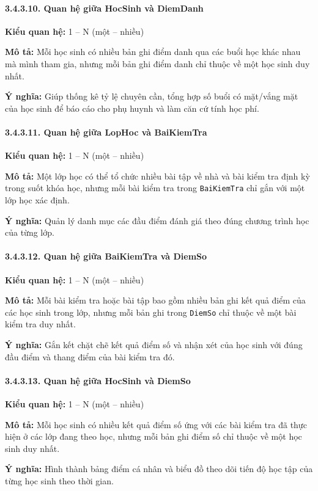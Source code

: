 \paragraph{3.4.3.10. Quan hệ giữa HocSinh và DiemDanh}\mbox{}\par
\textbf{Kiểu quan hệ:} 1 -- N (một -- nhiều)\par
\textbf{Mô tả:} Mỗi học sinh có nhiều bản ghi điểm danh qua các buổi học khác nhau mà mình tham gia, nhưng mỗi bản ghi điểm danh chỉ thuộc về một học sinh duy nhất.\par
\textbf{Ý nghĩa:} Giúp thống kê tỷ lệ chuyên cần, tổng hợp số buổi có mặt/vắng mặt của học sinh để báo cáo cho phụ huynh và làm căn cứ tính học phí.

\paragraph{3.4.3.11. Quan hệ giữa LopHoc và BaiKiemTra}\mbox{}\par
\textbf{Kiểu quan hệ:} 1 -- N (một -- nhiều)\par
\textbf{Mô tả:} Một lớp học có thể tổ chức nhiều bài tập về nhà và bài kiểm tra định kỳ trong suốt khóa học, nhưng mỗi bài kiểm tra trong \texttt{BaiKiemTra} chỉ gắn với một lớp học xác định.\par
\textbf{Ý nghĩa:} Quản lý danh mục các đầu điểm đánh giá theo đúng chương trình học của từng lớp.

\paragraph{3.4.3.12. Quan hệ giữa BaiKiemTra và DiemSo}\mbox{}\par
\textbf{Kiểu quan hệ:} 1 -- N (một -- nhiều)\par
\textbf{Mô tả:} Mỗi bài kiểm tra hoặc bài tập bao gồm nhiều bản ghi kết quả điểm của các học sinh trong lớp, nhưng mỗi bản ghi trong \texttt{DiemSo} chỉ thuộc về một bài kiểm tra duy nhất.\par
\textbf{Ý nghĩa:} Gắn kết chặt chẽ kết quả điểm số và nhận xét của học sinh với đúng đầu điểm và thang điểm của bài kiểm tra đó.

\paragraph{3.4.3.13. Quan hệ giữa HocSinh và DiemSo}\mbox{}\par
\textbf{Kiểu quan hệ:} 1 -- N (một -- nhiều)\par
\textbf{Mô tả:} Mỗi học sinh có nhiều kết quả điểm số ứng với các bài kiểm tra đã thực hiện ở các lớp đang theo học, nhưng mỗi bản ghi điểm số chỉ thuộc về một học sinh duy nhất.\par
\textbf{Ý nghĩa:} Hình thành bảng điểm cá nhân và biểu đồ theo dõi tiến độ học tập của từng học sinh theo thời gian.

